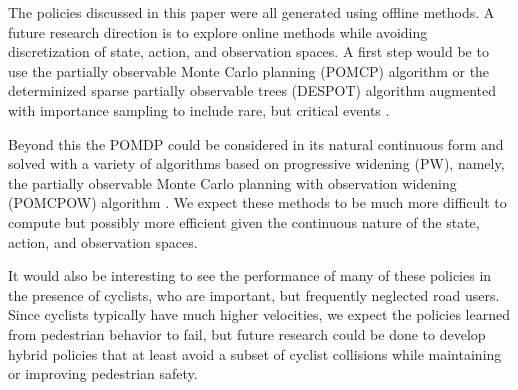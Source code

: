 \documentclass[conference]{IEEEtran}
\begin{document}
The policies discussed in this paper were all generated using offline methods. A future research direction is to explore online methods while avoiding discretization of state, action, and observation spaces. A first step would be to use the partially observable Monte Carlo planning (POMCP) algorithm \cite{Silver2010Monte-CarloPOMDPs} or the determinized sparse partially observable trees (DESPOT) algorithm augmented with importance sampling to include rare, but critical events \cite{Ye2017DESPOT:Regularization, Luo2019ImportanceUncertainty}. 

Beyond this the POMDP could be considered in its natural continuous form and solved with a variety of algorithms based on progressive widening (PW), namely, the partially observable Monte Carlo planning with observation widening (POMCPOW) algorithm \cite{Sunberg2018OnlineSpaces}. We expect these methods to be much more difficult to compute but possibly more efficient given the continuous nature of the state, action, and observation spaces.

It would also be interesting to see the performance of many of these policies in the presence of cyclists, who are important, but frequently neglected road users. Since cyclists typically have much higher velocities, we expect the policies learned from pedestrian behavior to fail, but future research could be done to develop hybrid policies that at least avoid a subset of cyclist collisions while maintaining or improving pedestrian safety.



\end{document}
